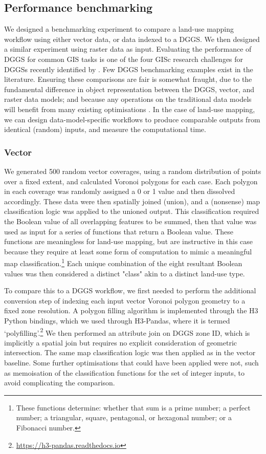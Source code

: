 \documentclass[]{interact}
\theoremstyle{plain}%
\theoremstyle{definition}
\theoremstyle{remark}
\begin{document}
\subsection{Performance benchmarking}

We designed a benchmarking experiment to compare a land-use mapping workflow using either vector data, or data indexed to a \ac{DGGS}. We then designed a similar experiment using raster data as input. Evaluating the performance of \ac{DGGS} for common \ac{GIS} tasks is one of the four \ac{GISc} research challenges for \acp{DGGS} recently identified by \citet{hojati2022giscience}. Few \ac{DGGS} benchmarking examples exist in the literature. Ensuring these comparisons are fair is somewhat fraught, due to the fundamental difference in object representation between the DGGS, vector, and raster data models; and because any operations on the traditional data models will benefit from many existing optimisations \citep{hojati2022giscience}. In the case of land-use mapping, we can design data-model-specific workflows to produce comparable outputs from identical (random) inputs, and measure the computational time.

\subsubsection{Vector}

We generated 500 random vector coverages, using a random distribution of points over a fixed extent, and calculated Voronoi polygons for each case. Each polygon in each coverage was randomly assigned a 0 or 1 value and then dissolved accordingly. These data were then spatially joined (union), and a (nonsense) map classification logic was applied to the unioned output. This classification required the Boolean value of all overlapping features to be summed, then that value was used as input for a series of functions that return a Boolean value. These functions are meaningless for land-use mapping, but are instructive in this case because they require at least some form of computation to mimic a meaningful map classification.\footnote{These functions determine: whether that sum is a prime number; a perfect number; a triangular, square, pentagonal, or hexagonal number; or a Fibonacci number.} Each unique combination of the eight resultant Boolean values was then considered a distinct "class" akin to a distinct land-use type.

To compare this to a \ac{DGGS} workflow, we first needed to perform the additional conversion step of indexing each input vector Voronoi polygon geometry to a fixed zone resolution. A polygon filling algorithm is implemented through the H3 Python bindings, which we used through H3-Pandas, where it is termed `polyfilling'.\footnote{\url{https://h3-pandas.readthedocs.io}} We then performed an attribute join on \ac{DGGS} zone ID, which is implicitly a spatial join but requires no explicit consideration of geometric intersection. The same map classification logic was then applied as in the vector baseline. Some further optimisations that could have been applied were not, such as memoisation of the classification functions for the set of integer inputs, to avoid complicating the comparison.
\end{document}
